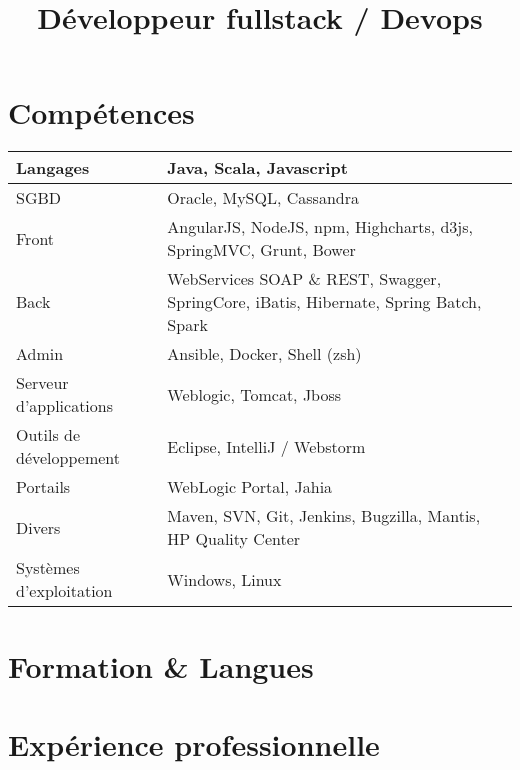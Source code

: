 \documentclass[11pt,a4paper,sans]{moderncv}        %
\title{Développeur fullstack / Devops}                               %
\begin{document}
    \makecvtitle


    \section{Compétences}
    \begin{tabular}[t]{| p{5cm} | p{12cm} |}
        \hline
        Langages & Java, Scala, Javascript \\
        \hline
        SGBD & Oracle, MySQL, Cassandra \\
        \hline
        Front & AngularJS, NodeJS, npm, Highcharts, d3js, SpringMVC, Grunt, Bower \\
        \hline
        Back & WebServices SOAP \& REST, Swagger, SpringCore, iBatis, Hibernate, Spring Batch, Spark \\
        \hline
        Admin & Ansible, Docker, Shell (zsh) \\
        \hline
        Serveur d’applications & Weblogic, Tomcat, Jboss \\
        \hline
        Outils de développement & Eclipse, IntelliJ / Webstorm \\
        \hline
        Portails & WebLogic Portal, Jahia \\
        \hline
        Divers & Maven, SVN, Git, Jenkins, Bugzilla, Mantis, HP Quality Center \\
        \hline
        Systèmes d’exploitation & Windows, Linux \\
        \hline
    \end{tabular}


    \section{Formation \& Langues}



    \section{Expérience professionnelle}
\end{document}
